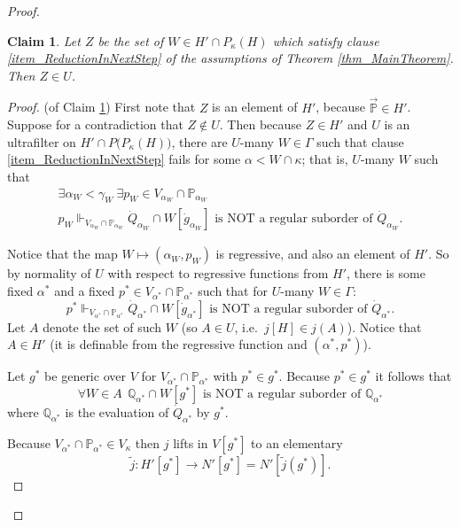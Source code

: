 \documentclass{amsart}
\newtheorem{nonGlobalClaim}{Claim}[theorem]  %
\begin{document}
\begin{proof}
\begin{nonGlobalClaim}\label{clm_U_many}
Let $Z$ be the set of $W \in H' \cap P_\kappa(H)$ which satisfy clause \ref{item_ReductionInNextStep} of the assumptions of Theorem \ref{thm_MainTheorem}.  Then $Z \in U$.
\end{nonGlobalClaim}
\begin{proof}
(of Claim \ref{clm_U_many})  First note that $Z$ is an element of $H'$, because $\vec{\mathbb{P}} \in H'$.  Suppose for a contradiction that $Z \notin U$.  Then because $Z \in H'$ and $U$ is an ultrafilter on $H' \cap P\big(P_\kappa(H)\big)$, there are $U$-many $W \in \Gamma$ such that clause \ref{item_ReductionInNextStep} fails for some $\alpha < W \cap \kappa$; that is, $U$-many $W$ such that
\begin{multline*}
\exists \alpha_W < \gamma_W \ \exists p_W \in V_{\alpha_W} \cap \mathbb{P}_{\alpha_W}  \\ p_W \Vdash_{V_{\alpha_W} \cap \mathbb{P}_{\alpha_W}} \dot{Q}_{\alpha_W} \cap W[\dot{g}_{\alpha_W}] \text{ is NOT a regular suborder of } \dot{Q}_{\alpha_W}.
\end{multline*}

Notice that the map $W \mapsto (\alpha_W, p_W)$ is regressive, and also an element of $H'$.  So by normality of $U$ with respect to regressive functions from $H'$, there is some fixed $\alpha^*$ and a fixed $p^* \in V_{\alpha^*} \cap \mathbb{P}_{\alpha^*}$ such that for $U$-many $W \in \Gamma$:
\begin{equation*}
p^* \Vdash_{V_{\alpha^*} \cap \mathbb{P}_{\alpha^*}} \dot{Q}_{\alpha^*} \cap W[\dot{g}_{\alpha^*}] \text{ is NOT a regular suborder of } \dot{Q}_{\alpha^*}.
\end{equation*}
Let $A$ denote the set of such $W$ (so $A \in U$, i.e.\ $j[H] \in j(A)$).  Notice that $A \in H'$ (it is definable from the regressive function and $(\alpha^*, p^*)$).

Let $g^*$ be generic over $V$ for $V_{\alpha^*} \cap \mathbb{P}_{\alpha^*}$ with $p^* \in g^*$.  Because $p^* \in g^*$ it follows that
\begin{equation}\label{eq_ToContradict}
\forall W \in A \ \ \mathbb{Q}_{\alpha^*} \cap W[g^*] \text{ is NOT a regular suborder of } \mathbb{Q}_{\alpha^*}
\end{equation}
where $\mathbb{Q}_{\alpha^*}$ is the evaluation of $\dot{Q}_{\alpha^*}$ by $g^*$.

Because $V_{\alpha^*} \cap \mathbb{P}_{\alpha^*} \in V_\kappa$ then $j$ lifts in $V[g^*]$ to an elementary
\begin{equation*}
\tilde{j}: H'[g^*] \to N'[g^*] = N'[\tilde{j}(g^*)].
\end{equation*}



\end{proof}
\end{proof}
\end{document}
